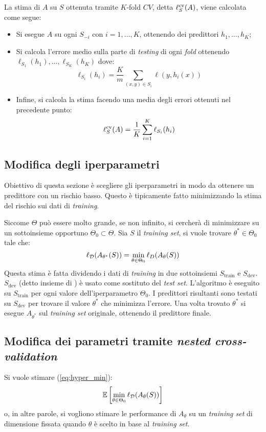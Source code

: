 La stima di $A$ su $S$ ottenuta tramite $K$-fold $CV$, detta $\ell_S^{\text{cv}}(A)$, viene
calcolata come segue:
\begin{itemize}
    \item Si esegue $A$ su ogni $S_{-i}$ con $i=1,\dots,K$, ottenendo dei
        predittori $h_1,\dots,h_K$;
    \item Si calcola l'errore medio sulla parte di \textit{testing} di ogni
        \textit{fold} ottenendo $\ell_{S_1}(h_1),\dots,\ell_{S_K}(h_K)$ dove:
        $$ \ell_{S_i}(h_i) = \frac{K}{m}\sum_{(x,y)\in S_i} \ell(y,h_i(x)) $$
    \item Infine, si calcola la stima facendo una media degli errori ottenuti
        nel precedente punto: 
        $$ \ell_S^{\text{cv}}(A) = \frac{1}{K} \sum_{i=1}^{K} \ell_{S_i}(h_i) $$
\end{itemize}

\subsection{Modifica degli iperparametri}
Obiettivo di questa sezione è scegliere gli iperparametri in modo da ottenere
un predittore con un rischio basso. Questo è tipicamente fatto minimizzando la
stima del rischio sui dati di \textit{training}.

Siccome $\Theta$ può essere molto grande, se non infinito, si cercherà di 
minimizzare su un sottoinsieme opportuno $\Theta_0\subset\Theta$. Sia $S$ il
\textit{training set}, si vuole trovare $\theta^*\in\Theta_0$ tale che:
\begin{equation} \label{eq:hyper_min}
    \ell_{\mathcal{D}}(A_{\theta^*}(S)) = \min_{\theta\in\Theta_0}\ell_D(A_\theta(S))
\end{equation}
Questa stima è fatta dividendo i dati di \textit{training} in due sottoinsiemi
$S_{\text{train}}$ e $S_{\text{dev}}$. $S_{\text{dev}}$ (detto insieme di
) è usato come sostituto del \textit{test set}. L'algoritmo
è eseguito su $S_{\text{train}}$ per ogni valore dell'iperparametro $\Theta_0$.
I predittori risultanti sono testati su $S_{\text{dev}}$ per trovare il valore
$\theta^*$ che minimizza l'errore. Una volta trovato $\theta^*$ si esegue 
$A_{\theta^*}$ sul \textit{training set} originale, ottenendo il predittore
finale.


\subsection{Modifica dei parametri tramite \textit{nested cross-validation}}
Si vuole stimare (\ref{eq:hyper_min}):
\begin{equation}\label{eq:hyper_mean}
    \mathbb{E}\left[ \min_{\theta\in\Theta_0}\ell_{\mathcal{D}}(A_\theta(S)) \right]
\end{equation}
o, in altre parole, si vogliono stimare le performance di $A_\theta$ su un
\textit{training set} di dimensione fissata quando $\theta$ è scelto in base
al \textit{training set}.

